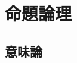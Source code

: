 \documentclass[a4paper]{jsarticle}
\title{\myTitle}
\author{\myAuthor}
\begin{document}
\maketitle

\section{命題論理}



\subsection{意味論}
\end{document}
